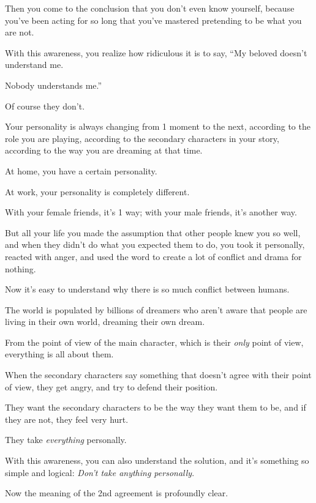 \documentclass{article}
\numberwithin{equation}{section}
\begin{document}

Then you come to the conclusion that you don't even know yourself, because you've been acting for so long that you've mastered pretending to be what you are not.

%
With this awareness, you realize how ridiculous it is to say, ``My beloved doesn't understand me.

Nobody understands me.''

Of course they don't.


Your personality is always changing from 1 moment to the next, according to the role you are playing, according to the secondary characters in your story, according to the way you are dreaming at that time.

At home, you have a certain personality.

At work, your personality is completely different.

With your female friends, it's 1 way; with your male friends, it's another way.

But all your life you made the assumption that other people knew you so well, and when they didn't do what you expected them to do, you took it personally, reacted with anger, and used the word to create a lot of conflict and drama for nothing.

%
Now it's easy to understand why there is so much conflict between humans.

The world is populated by billions of dreamers who aren't aware that people are living in their own world, dreaming their own dream.

From the point of view of the main character, which is their \textit{only} point of view, everything is all about them.

When the secondary characters say something that doesn't agree with their point of view, they get angry, and try to defend their position.

They want the secondary characters to be the way they want them to be, and if they are not, they feel very hurt.

They take \textit{everything} personally.

With this awareness, you can also understand the solution, and it's something so simple and logical: \textit{Don't take anything personally}.

%
Now the meaning of the 2nd agreement is profoundly clear.
\end{document}
